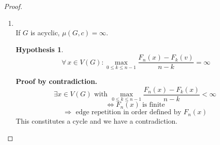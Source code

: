 \documentclass{article}
\newtheorem*{hypothesis}{Hypothesis}
\newcommand{\fall}{\;\forall\,}
\begin{document}
\begin{proof}
\begin{enumerate}
  \item ~\\
    If $G$ is acyclic, $\mu(G, c) = \infty$. \\
    \begin{hypothesis}
      \[ \fall x \in V(G): \max_{0 \leq k \leq n-1} \frac{F_n(x) - F_k(v)}{n-k} = \infty \]
    \end{hypothesis}
    \textbf{Proof by contradiction.}
    \[
      \exists x \in V(G) \text{ with } \max_{0 \leq k \leq n-1} \frac{F_n(x) - F_k(x)}{n-k} < \infty
    \] \[
      \Leftrightarrow F_n(x) \text{ is finite}
    \] \[
      \Rightarrow \text{ edge repetition in order defined by } F_n(x)
    \]
    This constitutes a cycle and we have a contradiction.


\end{enumerate}
\end{proof}
\end{document}
